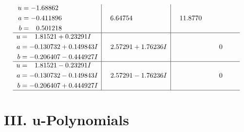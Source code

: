 \documentclass[1p]{elsarticle_modified}
\theoremstyle{definition}
\begin{document}
$$\begin{array}{c|c|c}
\begin{aligned}
u &= -1.68862\phantom{ +0.000000I} \\
a &= -0.411896\phantom{ +0.000000I} \\
b &= \phantom{-}0.501218\phantom{ +0.000000I}\end{aligned}
 & \phantom{-}6.64754\phantom{ +0.000000I} & \phantom{-}11.8770\phantom{ +0.000000I} \\ \hline\begin{aligned}
u &= \phantom{-}1.81521 + 0.23291 I \\
a &= -0.130732 + 0.149843 I \\
b &= -0.206407 - 0.444927 I\end{aligned}
 & \phantom{-}2.57291 + 1.76236 I & \phantom{-0.000000 } 0 \\ \hline\begin{aligned}
u &= \phantom{-}1.81521 - 0.23291 I \\
a &= -0.130732 - 0.149843 I \\
b &= -0.206407 + 0.444927 I\end{aligned}
 & \phantom{-}2.57291 - 1.76236 I & \phantom{-0.000000 } 0\\
 \hline 
 \end{array}$$\newpage
\newpage\renewcommand{\arraystretch}{1}
\centering \section*{ III. u-Polynomials}
\end{document}
